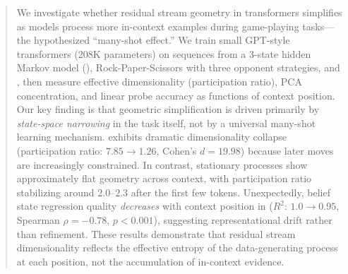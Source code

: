 \begin{abstract}
We investigate whether residual stream geometry in transformers simplifies as models process more in-context examples during game-playing tasks---the hypothesized ``many-shot effect.'' We train small GPT-style transformers (208K parameters) on sequences from a 3-state hidden Markov model (\messthree), Rock-Paper-Scissors with three opponent strategies, and \ttt, then measure effective dimensionality (participation ratio), PCA concentration, and linear probe accuracy as functions of context position. Our key finding is that geometric simplification is driven primarily by \emph{state-space narrowing} in the task itself, not by a universal many-shot learning mechanism. \ttt exhibits dramatic dimensionality collapse (participation ratio: $7.85 \to 1.26$, Cohen's $d = 19.98$) because later moves are increasingly constrained. In contrast, stationary processes show approximately flat geometry across context, with participation ratio stabilizing around $2.0$--$2.3$ after the first few tokens. Unexpectedly, belief state regression quality \emph{decreases} with context position in \messthree ($R^2$: $1.0 \to 0.95$, Spearman $\rho = -0.78$, $p < 0.001$), suggesting representational drift rather than refinement. These results demonstrate that residual stream dimensionality reflects the effective entropy of the data-generating process at each position, not the accumulation of in-context evidence.
\end{abstract}
